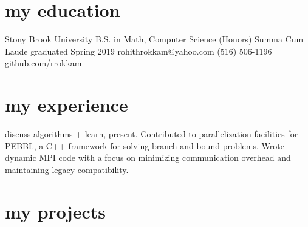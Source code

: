 \documentclass{cv}
\begin{document}


%
%

\section{my education}

\begin{entrylist}
    Stony Brook University
    B.S. in Math, Computer Science (Honors)
    Summa Cum Laude
    graduated Spring 2019
    rohithrokkam@yahoo.com
    (516) 506-1196
    github.com/rrokkam
\end{entrylist}

\section{my experience}

\begin{entrylist}
    {discuss algorithms + learn, present.}
    {Contributed to parallelization facilities for PEBBL, a C++ framework for solving branch-and-bound problems. Wrote dynamic MPI code with a focus on minimizing communication overhead and maintaining legacy compatibility.}
\end{entrylist}


\section{my projects}
\end{document}
